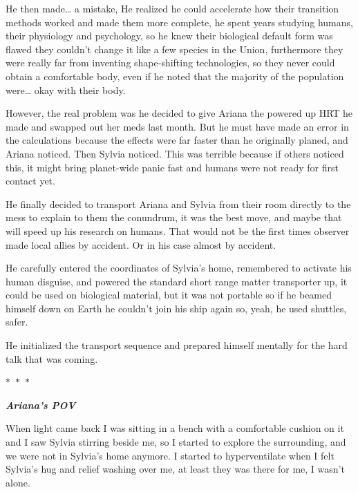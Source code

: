 \documentclass[hidelinks,12pt,a4paper]{book}
\newcommand\sep{\begin{center}
  \boldmath $\ast$~$\ast$~$\ast$
\end{center}}
\begin{document}
He then made… a mistake, He realized he could accelerate how their transition methods worked and 
made them more complete, he spent years studying humans, their physiology and psychology, so he knew their 
biological default form was flawed they couldn't change it like a few species in the Union, furthermore they were really far 
from inventing shape-shifting technologies, so they never could obtain a comfortable body, even if he noted
 that the majority of the population were… okay with their body. \par
 \bigskip

However, the real problem was he decided to give Ariana the powered up HRT he made and 
swapped out her meds last month. But he must have made an error in the calculations because the effects 
were far faster than he originally planed, and Ariana noticed. Then Sylvia noticed. This was terrible
 because if others noticed this, it might bring planet-wide panic fast and humans were not ready for first contact yet.\par
 \bigskip

He finally decided to transport Ariana and Sylvia from their room directly to the mess to explain to them the conundrum, 
it was the best move, and maybe that will speed up his research on humans. That would not be the first times 
observer made local allies by accident. Or in his case almost by accident. \par
\bigskip

He carefully entered the coordinates of Sylvia's home, remembered to activate his human disguise, 
and powered the standard short range matter transporter up, it could be used on biological material, 
but it was not portable so if he beamed himself down on Earth he couldn't join his ship again so, yeah, he used shuttles,
  safer.\par
  \bigskip

He initialized the transport sequence and prepared himself mentally for the hard talk that was coming.

\sep

\textit{\textbf{Ariana's POV}}\par
\bigskip

When light came back I was sitting in a bench with a comfortable cushion on it and I saw Sylvia stirring 
beside me, so I started to explore the surrounding, and we were not in Sylvia's home anymore. 
I started to hyperventilate when I felt Sylvia's hug and relief washing over me, at least they was there for me, 
I wasn't alone.\par
\bigskip
\end{document}
